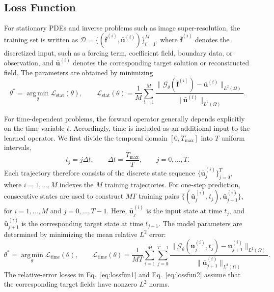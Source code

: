 \documentclass[preprint,numbers,sort&compress]{elsarticle}
\begin{document}
		\subsection{Loss Function}
		
		
		For stationary PDEs and inverse problems such as image super-resolution, the training set is written as $\mathcal D
		=\{(\bar{\boldsymbol f}^{(i)},
		\bar{\boldsymbol u}^{(i)})\}_{i=1}^{M}$, where $\bar{\boldsymbol f}^{(i)}$ denotes the discretized input, such as
		a forcing term, coefficient field, boundary data, or observation, and
		$\bar{\boldsymbol u}^{(i)}$ denotes the corresponding target solution
		or reconstructed field. The parameters are obtained by minimizing
		\begin{equation}
			\label{eq:lossfun2}
			\theta^*
			=
			\operatorname*{arg\,min}_{\theta}
			\mathcal L_{\mathrm{stat}}(\theta),
			\qquad
			\mathcal L_{\mathrm{stat}}(\theta)
			=
			\frac{1}{M}
			\sum_{i=1}^{M}
			\frac{
				\big\|
				\mathcal G_\theta
				(
				\bar{\boldsymbol f}^{(i)}
				)
				-
				\bar{\boldsymbol u}^{(i)}
				\big\|_{L^2(\Omega)}
			}{
				\big\|
				\bar{\boldsymbol u}^{(i)}
				\big\|_{L^2(\Omega)}
			}.
		\end{equation}
		
		For time-dependent problems, the forward operator generally depends explicitly on the time variable \(t\). Accordingly, time is included as an additional input to the learned operator. We first divide the temporal domain \([0,T_{\max}]\) into \(T\) uniform intervals,
		\[
		t_j=j\Delta t,
		\qquad
		\Delta t=\frac{T_{\max}}{T},
		\qquad
		j=0,\ldots,T.
		\]
		Each trajectory therefore consists of the discrete state sequence $\{\bar{\boldsymbol u}_j^{(i)}\}_{j=0}^{T}$, 
		where $i=1,\ldots,M$ indexes the $M$ training trajectories. For one-step prediction, consecutive states are used to construct $MT$ training pairs $\big\{
		(\bar{\boldsymbol u}_j^{(i)},t_j),
		\bar{\boldsymbol u}_{j+1}^{(i)} \big\}$, for $i=1,\ldots,M$ and $j=0,\ldots,T-1$. Here, $\bar{\boldsymbol u}_j^{(i)}$ is the input state at time $t_j$, and $\bar{\boldsymbol u}_{j+1}^{(i)}$ is the corresponding target state at time $t_{j+1}$. The model parameters are determined by minimizing the
		mean relative $L^2$ error:
		\begin{equation}
			\label{eq:lossfun1}
			\theta^*
			=
			\operatorname*{arg\,min}_{\theta}
			\mathcal L_{\mathrm{time}}(\theta),
			\qquad
			\mathcal L_{\mathrm{time}}(\theta)
			=
			\frac{1}{MT}
			\sum_{i=1}^{M}
			\sum_{j=0}^{T-1}
			\frac{
				\big\|
				\mathcal G_\theta
				(
				\bar{\boldsymbol u}_j^{(i)},t_j
				)
				-
				\bar{\boldsymbol u}_{j+1}^{(i)}
				\big\|_{L^2(\Omega)}
			}{
				\big\|
				\bar{\boldsymbol u}_{j+1}^{(i)}
				\big\|_{L^2(\Omega)}
			}.
		\end{equation}
		The relative-error losses in Eq.~\eqref{eq:lossfun1} and Eq.~\eqref{eq:lossfun2} assume that the corresponding target fields have nonzero \(L^2\) norms.
		
\end{document}
